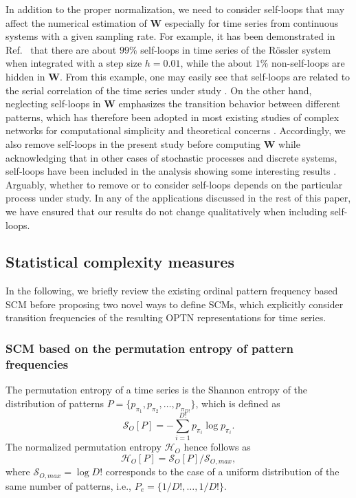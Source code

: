 \documentclass[12pt,aip,cha,reprint,nofootinbib]{revtex4-1}
\begin{document}
In addition to the proper normalization, we need to consider self-loops that may affect the numerical estimation of $\mathbf{W}$ especially for time series from continuous systems with a given sampling rate. For example, it has been demonstrated in Ref.~\cite{zhangSciRep2017} that there are about $99\%$ self-loops in time series of the R\"ossler system when integrated with a step size $h = 0.01$, while the about $1\%$ non-self-loops are hidden in $\mathbf{W}$. From this example, one may easily see that self-loops are related to the serial correlation of the time series under study \cite{BorgesAMC2019}. On the other hand, neglecting self-loops in $\mathbf{W}$ emphasizes the transition behavior between different patterns, which has therefore been adopted in most existing studies of complex networks for computational simplicity and theoretical concerns \cite{CostaADPhy2007}. Accordingly, we also remove self-loops in the present study before computing $\mathbf{W}$ while acknowledging that in other cases of stochastic processes and discrete systems, self-loops have been included in the analysis showing some interesting results \cite{BorgesAMC2019}. Arguably, whether to remove or to consider self-loops depends on the particular process under study. In any of the applications discussed in the rest of this paper, we have ensured that our results do not change qualitatively when including self-loops.

\subsection{Statistical complexity measures} \label{sec:SCM}

In the following, we briefly review the existing ordinal pattern frequency based SCM before proposing two novel ways to define SCMs, which explicitly consider transition frequencies of the resulting OPTN representations for time series. 
 
\subsubsection{SCM based on the permutation entropy of pattern frequencies} 

The permutation entropy of a time series is the Shannon entropy of the distribution of patterns $P = \{p_{\pi_1}, p_{\pi_2},\ldots,p_{\pi_{D!}} \}$, which is defined as
\begin{equation}
\mathcal{S}_{O}[P]= - \sum_{i=1}^{D!} p_{\pi_i} \log p_{\pi_i}. 
\end{equation}
The normalized permutation entropy $\mathcal{H}_O$ hence follows as 
\begin{equation} \label{eq:Ho}
\mathcal{H}_{O}[P] = \mathcal{S}_{O}[P] / \mathcal{S}_{O, max}, 
\end{equation}
where $\mathcal{S}_{O, max} = \log D!$ corresponds to the case of a uniform distribution of the same number of patterns, i.e., $P_e = \{1/D!, \ldots, 1/D!\}$. 
\end{document}
